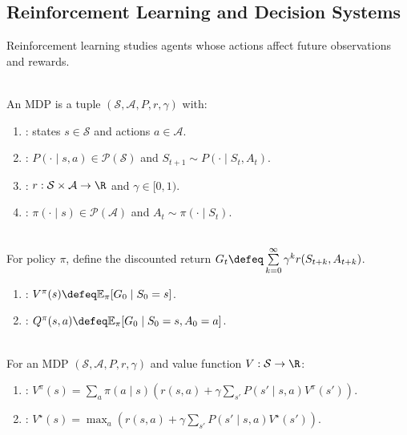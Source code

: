 \subsection{Reinforcement Learning and Decision Systems}

Reinforcement learning studies agents whose actions affect future observations and rewards.

\begin{definition} \label{def:sl-markov-decision-process} \\
An MDP is a tuple $(\mathcal S,\mathcal A,P,r,\gamma)$ with:
\begin{enumerate}[label=(\roman*)]
\setlength{\itemsep}{0pt}
\item {}: states $s\in\mathcal S$ and actions $a\in\mathcal A$.
\item {}: $P(\cdot\mid s,a)\in\mathcal P(\mathcal S)$ and $S_{t+1}\sim P(\cdot\mid S_t,A_t)$.
\item {}: $r:\mathcal S\times\mathcal A\to\R$ and $\gamma\in[0,1)$.
\item {}: $\pi(\cdot\mid s)\in\mathcal P(\mathcal A)$ and $A_t\sim\pi(\cdot\mid S_t)$.
\end{enumerate}
\end{definition}

\begin{definition} \label{def:sl-value-functions} \\
For policy $\pi$, define the discounted return $G_t\defeq\sum\limits_{k=0}^{\infty}\gamma^kr(S_{t+k},A_{t+k})$.
\begin{enumerate}[label=(\roman*)]
\setlength{\itemsep}{0pt}
\item {}: $V^\pi(s)\defeq\mathbb{E}_\pi[G_0\mid S_0=s]$.
\item {}: $Q^\pi(s,a)\defeq\mathbb{E}_\pi[G_0\mid S_0=s,A_0=a]$.
\end{enumerate}
\end{definition}

\begin{definition} \label{def:sl-bellman-equation} \\
For an MDP $(\mathcal S,\mathcal A,P,r,\gamma)$ and value function $V:\mathcal S\to\R$:
\begin{enumerate}[label=(\roman*)]
\setlength{\itemsep}{0pt}
\item {}: $V^\pi(s)=\sum_a\pi(a\mid s)(r(s,a)+\gamma\sum_{s'}P(s'\mid s,a)V^\pi(s'))$.
\item {}: $V^\star(s)=\max_a(r(s,a)+\gamma\sum_{s'}P(s'\mid s,a)V^\star(s'))$.
\end{enumerate}
\end{definition}

